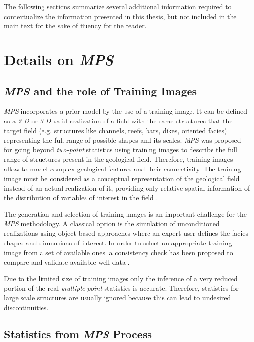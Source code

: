 The following sections summarize several additional information required to contextualize the information presented in this thesis, but not included in the main text for the sake of fluency for the reader.

\section{Details on \emph{MPS}}
\label{sec_app_GLOBALMPS}

\subsection{\emph{MPS} and the role of Training Images}
\label{sec_TrainingImages}

\emph{MPS} incorporates a prior model by the use of a training image. It can be defined as a \emph{2-D} or \emph{3-D} valid realization of a field with the same structures that the target field (e.g. structures like channels, reefs, bars, dikes, oriented facies) representing the full range of possible shapes and its scales. \emph{MPS} was proposed for going beyond \emph{two-point} statistics \citep{guardiano_1993} using training images to describe the full range of structures present in the geological field. Therefore, training images allow to model complex geological features and their connectivity. The training image must be considered as a conceptual representation of the geological field instead of an actual realization of it, providing only relative spatial information of the distribution of variables of interest in the field \citep{Scheidt2009_a}.

The generation and selection of training images is an important challenge for the \emph{MPS} methodology. A classical option is the simulation of unconditioned realizations using object-based approaches where an expert user defines the facies shapes and dimensions of interest. In order to select an appropriate training image from a set of available ones, a consistency check has been proposed to compare and validate available well data \citep{Strebelle_2004a}.

Due to the limited size of training images only the inference of a very reduced portion of the real \emph{multiple-point} statistics is accurate. Therefore, statistics for large scale structures are usually ignored because this can lead to undesired discontinuities.

	
\subsection{Statistics from \emph{MPS} Process}
\label{sec_StatsTrainingImages}

